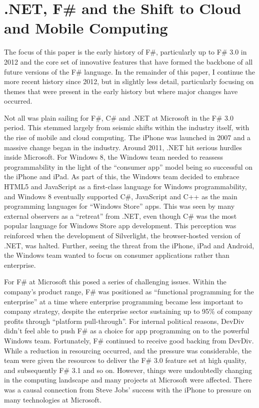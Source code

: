 \documentclass[acmsmall,review]{acmart}\settopmatter{printfolios=true,printccs=false,printacmref=false}
\begin{document}
\section*{.NET, F\# and the Shift to Cloud and Mobile Computing}

The focus of this paper is the early history of F\#, particularly up to F\# 3.0 in 2012 and the core set of innovative features that have formed the backbone of all future versions of the F\# language. In the remainder of this paper, I continue the more recent history since 2012, but in slightly less detail, particularly focusing on themes that were present in the early history but where major changes have occurred.

Not all was plain sailing for F\#, C\# and .NET at Microsoft in the F\# 3.0 period.  This stemmed largely from seismic shifts within the industry itself, with the rise of mobile and cloud computing.  The iPhone was launched in 2007 and a massive change began in the industry. Around 2011, .NET hit serious hurdles inside Microsoft. For Windows 8, the Windows team needed to reassess programmability in the light of the “consumer app” model being so successful on the iPhone and iPad. As part of this, the Windows team decided to embrace HTML5 and JavaScript as a first-class language for Windows programmability, and Windows 8 eventually supported C\#, JavaScript and C++ as the main programming languages for “Windows Store” apps.  This was seen by many external observers as a “retreat” from .NET, even though C\# was the most popular language for Windows Store app development. This perception was reinforced when the development of Silverlight, the browser-hosted version of .NET, was halted. Further, seeing the threat from the iPhone, iPad and Android, the Windows team wanted to focus on consumer applications rather than enterprise.  

For F\# at Microsoft this posed a series of challenging issues. Within the company’s product range, F\# was positioned as “functional programming for the enterprise” at a time where enterprise programming became less important to company strategy, despite the enterprise sector sustaining up to 95\% of company profits through “platform pull-through”. For internal political reasons, DevDiv didn’t feel able to push F\# as a choice for app programming on to the powerful Windows team. Fortunately, F\# continued to receive good backing from DevDiv. While a reduction in resourcing occurred, and the pressure was considerable, the team were given the resources to deliver the F\# 3.0 feature set at high quality, and subsequently F\# 3.1 and so on.  However, things were undoubtedly changing in the computing landscape and many projects at Microsoft were affected. There was a causal connection from Steve Jobs’ success with the iPhone to pressure on many technologies at Microsoft.  
\end{document}
